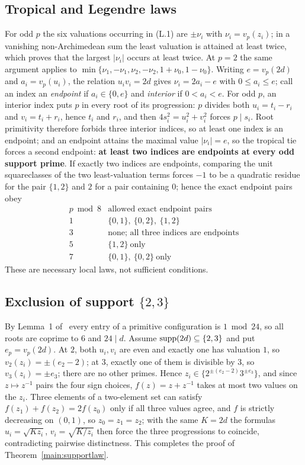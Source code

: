 \subsection{Tropical and Legendre laws}

For odd $p$ the six valuations occurring in (L.1) are
$\pm\nu_i$ with $\nu_i=v_p(z_i)$; in a vanishing non-Archimedean sum the
least valuation is attained at least twice, which proves that the largest
$|\nu_i|$ occurs at least twice. At $p=2$ the same argument applies to
$\min\{\nu_1,-\nu_1,\nu_2,-\nu_2,1+\nu_0,1-\nu_0\}$. Writing $e=v_p(2d)$
and $a_i=v_p(u_i)$, the relation $u_iv_i=2d$ gives $\nu_i=2a_i-e$ with
$0\le a_i\le e$; call an index an \emph{endpoint} if $a_i\in\{0,e\}$ and
\emph{interior} if $0<a_i<e$. For odd $p$, an interior index puts $p$ in
every root of its progression: $p$ divides both $u_i=t_i-r_i$ and
$v_i=t_i+r_i$, hence $t_i$ and $r_i$, and then $4s_i^2=u_i^2+v_i^2$ forces
$p\mid s_i$. Root primitivity therefore forbids three interior indices, so
at least one index is an endpoint; and an endpoint attains the maximal
value $|\nu_i|=e$, so the tropical tie forces a second endpoint:
\textbf{at least two indices are endpoints at every odd support prime}.
If exactly two indices are endpoints, comparing
the unit squareclasses of the two least-valuation terms forces $-1$ to be a
quadratic residue for the pair $\{1,2\}$ and $2$ for a pair containing
$0$; hence the exact endpoint pairs obey
\[
\begin{array}{r|l}
p\bmod 8 & \text{allowed exact endpoint pairs}\\\hline
1 & \{0,1\},\ \{0,2\},\ \{1,2\}\\
3 & \text{none; all three indices are endpoints}\\
5 & \{1,2\}\ \text{only}\\
7 & \{0,1\},\ \{0,2\}\ \text{only}
\end{array}
\]
These are necessary local laws, not sufficient conditions.

\subsection{Exclusion of support $\{2,3\}$}

By Lemma~1 of~\cite{PTZ15} every entry of a primitive configuration is
$1\bmod24$, so all roots are coprime to $6$ and $24\mid d$. Assume
$\operatorname{supp}(2d)\subseteq\{2,3\}$ and put $e_p=v_p(2d)$. At $2$, both $u_i,v_i$
are even and exactly one has valuation $1$, so $v_2(z_i)=\pm(e_2-2)$; at
$3$, exactly one of them is divisible by $3$, so $v_3(z_i)=\pm e_3$; there
are no other primes. Hence $z_i\in\{2^{\pm(e_2-2)}3^{\pm e_3}\}$, and since
$z\mapsto z^{-1}$ pairs the four sign choices, $f(z)=z+z^{-1}$ takes at
most two values on the $z_i$. Three elements of a two-element set can
satisfy $f(z_1)+f(z_2)=2f(z_0)$ only if all three values agree, and $f$ is
strictly decreasing on $(0,1)$, so $z_0=z_1=z_2$; with the same $K=2d$ the
formulas $u_i=\sqrt{Kz_i}$, $v_i=\sqrt{K/z_i}$ then force the three
progressions to coincide, contradicting pairwise distinctness. This
completes the proof of Theorem~\ref{main:supportlaw}.

